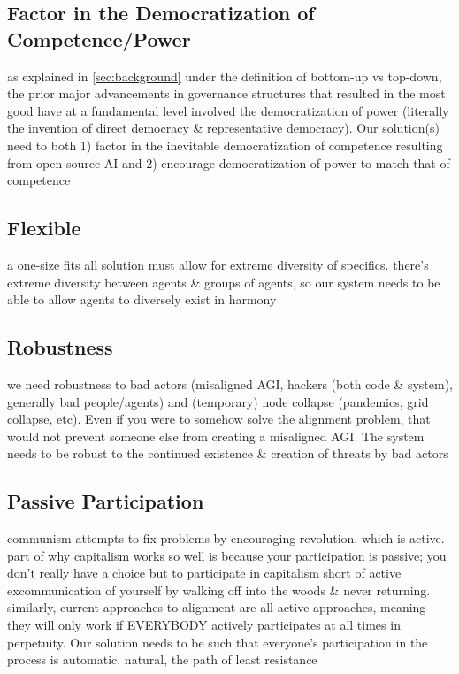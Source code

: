 \documentclass{article}
\begin{document}
\subsection{Factor in the Democratization of Competence/Power}
as explained in \ref{sec:background} under the definition of bottom-up vs top-down, the prior major advancements in governance structures that resulted in the most good have at a fundamental level involved the democratization of power (literally the invention of direct democracy \& representative democracy). Our solution(s) need to both 1) factor in the inevitable democratization of competence resulting from open-source AI and 2) encourage democratization of power to match that of competence

\subsection{Flexible}
a one-size fits all solution must allow for extreme diversity of specifics. there's extreme diversity between agents \& groups of agents, so our system needs to be able to allow agents to diversely exist in harmony

\subsection{Robustness}
we need robustness to bad actors (misaligned AGI, hackers (both code \& system), generally bad people/agents) and (temporary) node collapse (pandemics, grid collapse, etc). Even if you were to somehow solve the alignment problem, that would not prevent someone else from creating a misaligned AGI. The system needs to be robust to the continued existence \& creation of threats by bad actors

\subsection{Passive Participation}
communism attempts to fix problems by encouraging revolution, which is active. part of why capitalism works so well is because your participation is passive; you don't really have a choice but to participate in capitalism short of active excommunication of yourself by walking off into the woods \& never returning. similarly, current approaches to alignment are all active approaches, meaning they will only work if EVERYBODY actively participates at all times in perpetuity. Our solution needs to be such that everyone's participation in the process is automatic, natural, the path of least resistance
\end{document}
